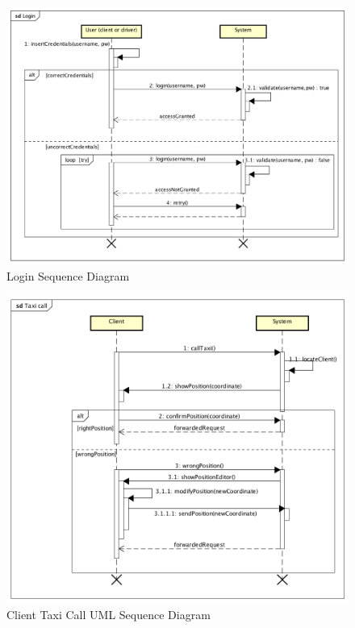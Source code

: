 \documentclass[a4paper]{article}
\begin{document}
\begin{figure}[H]
\includegraphics[width=\sequenceWidth]{Sequence-Login}
\centering
\caption{Login Sequence Diagram}
\label{fig:sequencelogin}
\end{figure}

\begin{figure}[H]
\includegraphics[width=\sequenceWidth]{Sequence-Client-TaxiCall}
\centering
\caption{Client Taxi Call UML Sequence Diagram}
\label{fig:sequenceclienttaxicall}
\end{figure}
\end{document}
